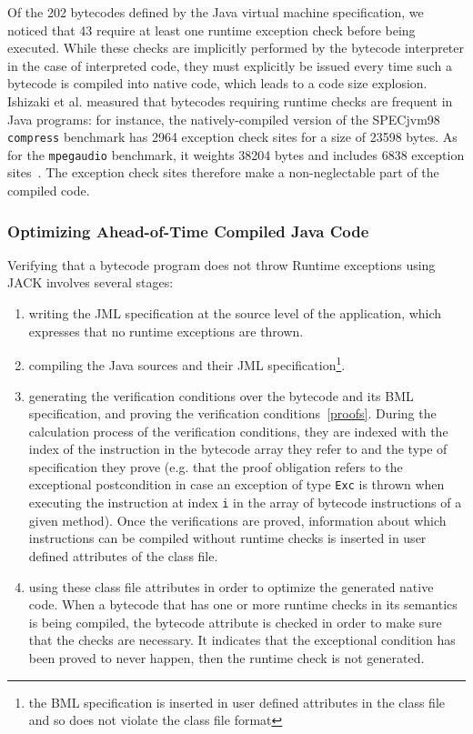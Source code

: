 Of the 202 bytecodes defined by the Java virtual machine specification, we noticed that 43 require at least one runtime exception check before being executed. While these checks are implicitly performed by the bytecode interpreter in the case of interpreted code, they must explicitly be issued every time such a bytecode is compiled into native code, which leads to a code size explosion. Ishizaki et al. measured that bytecodes requiring runtime checks are frequent in Java programs: for instance, the natively-compiled version of the SPECjvm98 \texttt{compress} benchmark has 2964 exception check sites for a size of 23598 bytes. As for the \texttt{mpegaudio} benchmark, it weights 38204 bytes and includes 6838 exception sites~\cite{Ishizaki1999}. The exception check sites therefore make a non-neglectable part of the compiled code.

\subsubsection{Optimizing Ahead-of-Time Compiled Java Code}
\label{sec:method}

Verifying that a bytecode program does not throw Runtime exceptions using JACK involves several stages:
\begin{enumerate}
\item writing the JML specification at the source level of the application, which expresses that no runtime exceptions are thrown.
\item compiling the Java sources and their JML specification\footnote{the BML specification is inserted in user defined attributes in the class file and so does not violate the class file format}.
\item generating the verification conditions over the bytecode and its BML specification, and proving the verification conditions~\ref{proofs}. During the calculation process of the verification conditions, they are indexed with the index of the instruction in the bytecode array they refer to and the type of specification they prove (e.g. that the proof obligation refers to the exceptional postcondition in case an exception of type \texttt{Exc} is thrown when executing the instruction at index \texttt{i} in the array of bytecode instructions of a given method). Once the verifications are proved, information about which instructions can be compiled without runtime checks is inserted in user defined attributes of the class file.
\item using these class file attributes in order to optimize the generated native code. When a bytecode that has one or more runtime checks in its semantics is being compiled, the bytecode attribute is checked in order to make sure that the checks are necessary. It indicates that the exceptional condition has been proved to never happen, then the runtime check is not generated.
\end{enumerate}

